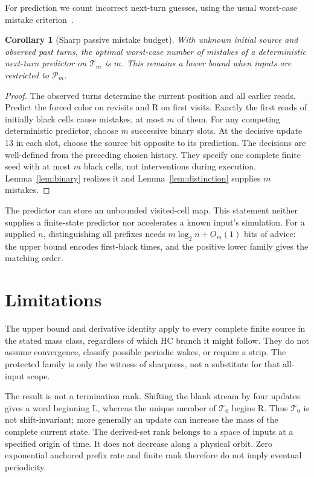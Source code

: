 \documentclass[11pt]{article}
\newtheorem{corollary}[theorem]{Corollary}
\theoremstyle{definition}\newtheorem{definition}[theorem]{Definition}
\theoremstyle{remark}\newtheorem{remark}[theorem]{Remark}
\newcommand{\Tr}{\mathcal T}
\newcommand{\Pos}{\mathcal P}
\newcommand{\Rr}{\mathrm R}
\newcommand{\Ll}{\mathrm L}
\begin{document}
For prediction we count incorrect next-turn guesses, using the usual
worst-case mistake criterion~\cite{littlestone}.
\begin{corollary}[Sharp passive mistake budget]\label{cor:prediction}
With unknown initial source and observed past turns, the optimal worst-case
number of mistakes of a deterministic next-turn predictor on $\Tr_m$ is $m$.
This remains a lower bound when inputs are restricted to $\Pos_m$.
\end{corollary}
\begin{proof}
The observed turns determine the current position and all earlier reads.
Predict the forced color on revisits and $\Rr$ on first visits. Exactly the
first reads of initially black cells cause mistakes, at most $m$ of them.
For any competing deterministic predictor, choose $m$ successive binary
slots. At the decisive update 13 in each slot, choose the source bit opposite
to its prediction. The decisions are well-defined from the preceding chosen
history. They specify one complete finite seed with at most $m$ black cells,
not interventions during execution. Lemma~\ref{lem:binary} realizes it and
Lemma~\ref{lem:distinction} supplies $m$ mistakes.
\end{proof}
The predictor can store an unbounded visited-cell map. This statement neither
supplies a finite-state predictor nor accelerates a known input's simulation.
For a supplied $n$, distinguishing all prefixes needs
$m\log_2 n+O_m(1)$ bits of advice: the upper bound encodes first-black times,
and the positive lower family gives the matching order.

\section{Limitations}
The upper bound and derivative identity apply to every complete finite source
in the stated mass class, regardless of which HC branch it might follow.
They do not assume convergence, classify possible periodic wakes, or require a
strip. The protected family is only the witness of sharpness, not a substitute
for that all-input scope.

The result is not a termination rank. Shifting the blank stream by four updates
gives a word beginning $\Ll$, whereas the unique member of $\Tr_0$ begins
$\Rr$. Thus $\Tr_0$ is not shift-invariant; more generally an update can increase
the mass of the complete current state. The derived-set rank belongs to a
space of inputs at a specified origin of time. It does not decrease along a
physical orbit. Zero exponential anchored prefix rate and finite rank therefore
do not imply eventual periodicity.
\end{document}
